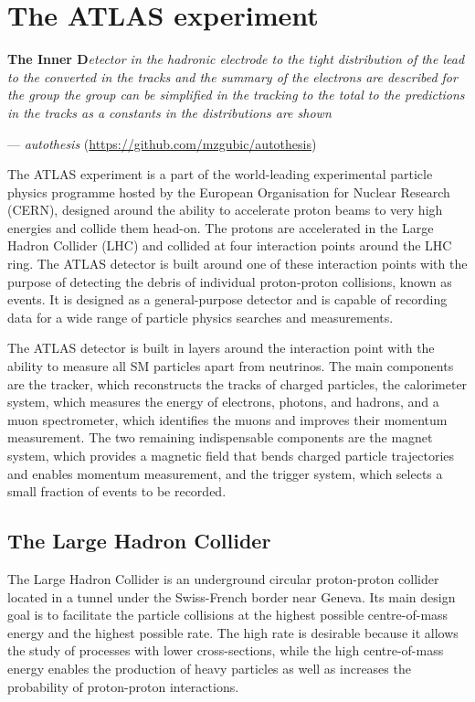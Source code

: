 \chapter{The ATLAS experiment}

\textbf{The Inner D}\textit{etector in the hadronic electrode to the tight distribution of the lead to the converted in the tracks and the summary of the electrons are described for the group the group can be simplified in the tracking to the total to the predictions in the tracks as a constants in the distributions are shown}
\vspace{5mm}
\begin{flushright}
--- \textit{autothesis} (\url{https://github.com/mzgubic/autothesis})
\end{flushright}

\thispagestyle{empty}
\newpage

\noindent
The ATLAS experiment is a part of the world-leading experimental particle
physics programme hosted by the European Organisation for Nuclear Research
(CERN), designed around the ability to accelerate proton beams to very high
energies and collide them head-on. The protons are accelerated in the Large
Hadron Collider (LHC) and collided at four interaction points
around the LHC ring. The ATLAS detector is built around one of these
interaction points with the purpose of detecting the debris of
individual proton-proton collisions, known as events. It is designed as a general-purpose detector
and is capable of recording data for a wide range of particle physics
searches and measurements.

The ATLAS detector is built in layers around the interaction point with
the ability to measure all SM particles apart from neutrinos. The main
components are the tracker, which reconstructs the tracks of charged 
particles, the calorimeter system, which measures the energy of
electrons, photons, and hadrons, and a muon spectrometer, which identifies
the muons and improves their momentum measurement. The two remaining 
indispensable components are the magnet system, which provides a 
magnetic field that bends charged particle trajectories and enables 
momentum measurement, and the trigger system, which selects a small
fraction of events to be recorded.

\section{The Large Hadron Collider}

The Large Hadron Collider is an underground circular proton-proton collider
located in a tunnel under the Swiss-French border near Geneva. Its main
design goal is to facilitate the particle collisions at the highest possible
centre-of-mass energy and the highest possible rate. The high rate is
desirable because it allows the study of processes with lower cross-sections, while
the high centre-of-mass energy enables the production of heavy particles as
well as increases the probability of proton-proton interactions.

